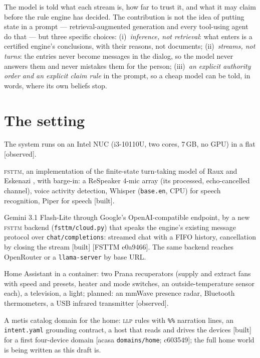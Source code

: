 \documentclass[11pt]{article}
\newcommand{\llp}{\textsc{llp}}
\newcommand{\fsttm}{\textsc{fsttm}}
\newcommand{\src}[1]{{\footnotesize\textsf{[#1]}}}
\newcommand{\built}{\textsf{\small[built]}}
\newcommand{\observed}{\textsf{\small[observed]}}
\begin{document}
\noindent The model is told what each stream is, how far to trust it, and what it may claim
before the rule engine has decided. The contribution is not the idea of putting state in a
prompt --- retrieval-augmented generation \cite{lewis2020rag} and every tool-using agent
\cite{yao2023react,schick2023toolformer} do that --- but three specific choices:
(i)~\emph{inference, not retrieval}: what enters is a certified engine's conclusions, with
their reasons, not documents; (ii)~\emph{streams, not turns}: the entries never become
messages in the dialog, so the model never answers them and never mistakes them for the
person; (iii)~\emph{an explicit authority order and an explicit claim rule} in the prompt,
so a cheap model can be told, in words, where its own beliefs stop.

\section{The setting}\label{sec:setting}

The system runs on an Intel NUC (i3-10110U, two cores, 7\,GB, no GPU) in a flat \observed{}.

\begin{description}[nosep,leftmargin=1.2em]
\item[Voice.] \fsttm{}, an implementation of the finite-state turn-taking model of Raux and
Eskenazi \cite{raux2009fsttm}, with barge-in: a ReSpeaker 4-mic array (its processed,
echo-cancelled channel), voice activity detection, Whisper \cite{radford2023whisper}
(\texttt{base.en}, CPU) for speech recognition, Piper for speech \built.
\item[Model.] Gemini 3.1 Flash-Lite through Google's OpenAI-compatible endpoint, by a new
\fsttm{} backend (\texttt{fsttm/cloud.py}) that speaks the engine's existing message protocol
over \texttt{chat/completions}: streamed chat with a FIFO history, cancellation by closing the
stream \built{} \src{FSTTM e0a9466}. The same backend reaches OpenRouter or a
\texttt{llama-server} by base URL.
\item[Devices.] Home Assistant in a container: two Prana recuperators (supply and extract
fans with speed and presets, heater and mode switches, an outside-temperature sensor each),
a television, a light; planned: an mmWave presence radar, Bluetooth thermometers, a USB
infrared transmitter \observed.
\item[Rules.] A metis catalog domain for the home: \llp{} rules with \texttt{\%\%} narration
lines, an \texttt{intent.yaml} grounding contract, a host that reads and drives the devices
\built{} for a first four-device domain \src{acasa \texttt{domains/home}; c603549}; the full
home world is being written as this draft is.
\end{description}
\end{document}
